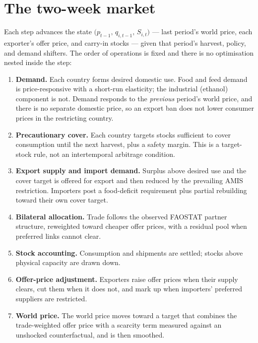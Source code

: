 \section{The two-week market}
\label{sec:dynamics}

Each step advances the state
\(\bigl(p_{t-1},\,q_{i,t-1},\,S_{i,t}\bigr)\) --- last period's world
price, each exporter's offer price, and carry-in stocks --- given that
period's harvest, policy, and demand shifters. The order of operations is
fixed and there is no optimisation nested inside the step:

\begin{enumerate}
\item \textbf{Demand.} Each country forms desired domestic use. Food and
      feed demand is price-responsive with a short-run elasticity; the
      industrial (ethanol) component is not. Demand responds to the
      \emph{previous} period's world price, and there is no separate
      domestic price, so an export ban does not lower consumer prices in
      the restricting country.
\item \textbf{Precautionary cover.} Each country targets stocks sufficient
      to cover consumption until the next harvest, plus a safety margin.
      This is a target-stock rule, not an intertemporal arbitrage
      condition.
\item \textbf{Export supply and import demand.} Surplus above desired use
      and the cover target is offered for export and then reduced by the
      prevailing AMIS restriction. Importers post a food-deficit
      requirement plus partial rebuilding toward their own cover target.
\item \textbf{Bilateral allocation.} Trade follows the observed FAOSTAT
      partner structure, reweighted toward cheaper offer prices, with a
      residual pool when preferred links cannot clear.
\item \textbf{Stock accounting.} Consumption and shipments are settled;
      stocks above physical capacity are drawn down.
\item \textbf{Offer-price adjustment.} Exporters raise offer prices when
      their supply clears, cut them when it does not, and mark up when
      importers' preferred suppliers are restricted.
\item \textbf{World price.} The world price moves toward a target that
      combines the trade-weighted offer price with a scarcity term
      measured against an unshocked counterfactual, and is then smoothed.
\end{enumerate}

